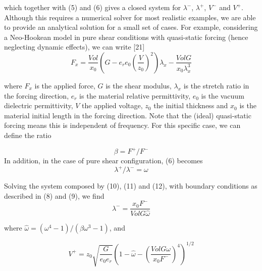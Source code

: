 which together with (5) and (6) gives a closed system for $\lambda^-$, $\lambda^+$, $V^-$ and $V^+$. Although this requires a numerical solver for most realistic examples, we are able to provide an analytical solution for a small set of cases. For example, considering a Neo-Hookean model in pure shear conditions with quasi-static forcing (hence neglecting dynamic effects), we can write [21]
\begin{equation}
F_x=   \frac{Vol}{x_0}\left(G-e_r e_0 \left(\frac{V}{z_0} \right)^2 \right) \lambda_x-\frac{Vol G}{x_0 \lambda_x^3 }
\end{equation}

where $F_x$ is the applied force, $G$ is the shear modulus, $\lambda_x$   is the stretch ratio in the forcing direction, $e_r$ is the material relative permittivity, $e_0$ is the vacuum dielectric permittivity, $V$ the applied voltage, $z_0$ the initial thickness and $x_0$ is the material initial length in the forcing direction. Note that the (ideal) quasi-static forcing means this is independent of frequency.
For this specific case, we can define the ratio

\begin{equation}
\beta=F^+/F^-
\end{equation}
In addition, in the case of pure shear configuration, (6) becomes
\begin{equation}
\lambda^+/\lambda^- =\omega
\end{equation}

Solving the system composed by (10), (11) and (12), with boundary conditions as described in (8) and (9), we find 
\begin{equation}
\lambda^-=\frac{x_0 F^-}{VolG\hat{\omega}}
\end{equation}

where $\hat{\omega} = (\omega^4-1)/(\beta\omega^3-1)$, and

\begin{equation}
V^+=z_0 \sqrt{\frac{G}{e_0e_r}}\left(1-\hat{\omega}-\left(\frac{Vol G\omega}{x_0 F^- }\right)^{4}\right)^{1/2}
\end{equation}

